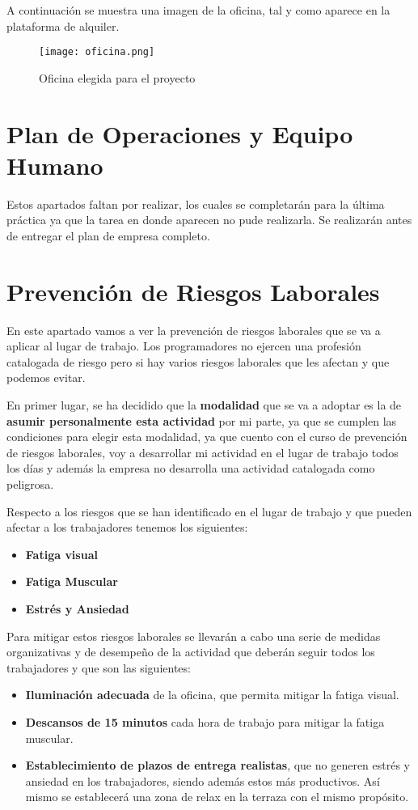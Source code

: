 A continuación se muestra una imagen de la oficina, tal y como aparece en la plataforma de alquiler.

\begin{figure}[H]
    \centering
    \texttt{[image: oficina.png]}
    \caption{Oficina elegida para el proyecto}
\end{figure}

\section{Plan de Operaciones y Equipo Humano}
Estos apartados faltan por realizar, los cuales se completarán para la última práctica ya que la tarea en donde aparecen no pude realizarla. Se realizarán antes de entregar el plan de empresa completo.

\section{Prevención de Riesgos Laborales}
En este apartado vamos a ver la prevención de riesgos laborales que se va a aplicar al lugar de trabajo. Los programadores no ejercen una profesión catalogada de riesgo pero si hay varios riesgos laborales que les afectan y que podemos evitar.

En primer lugar, se ha decidido que la \textbf{modalidad} que se va a adoptar es la de \textbf{asumir personalmente esta actividad} por mi parte, ya que se cumplen las condiciones para elegir esta modalidad, ya que cuento con el curso de prevención de riesgos laborales, voy a desarrollar mi actividad en el lugar de trabajo todos los días y además la empresa no desarrolla una actividad catalogada como peligrosa.

Respecto a los riesgos que se han identificado en el lugar de trabajo y que pueden afectar a los trabajadores tenemos los siguientes:

\begin{itemize}
    \item \textbf{Fatiga visual}
    \item \textbf{Fatiga Muscular}
    \item \textbf{Estrés y Ansiedad}
\end{itemize}

Para mitigar estos riesgos laborales se llevarán a cabo una serie de medidas organizativas y de desempeño de la actividad que deberán seguir todos los trabajadores y que son las siguientes:

\begin{itemize}
    \item \textbf{Iluminación adecuada} de la oficina, que permita mitigar la fatiga visual.
    \item \textbf{Descansos de 15 minutos} cada hora de trabajo para mitigar la fatiga muscular.
    \item \textbf{Establecimiento de plazos de entrega realistas}, que no generen estrés y ansiedad en los trabajadores, siendo además
    estos más productivos. Así mismo se establecerá una zona de relax en la terraza con el mismo propósito.
\end{itemize}

